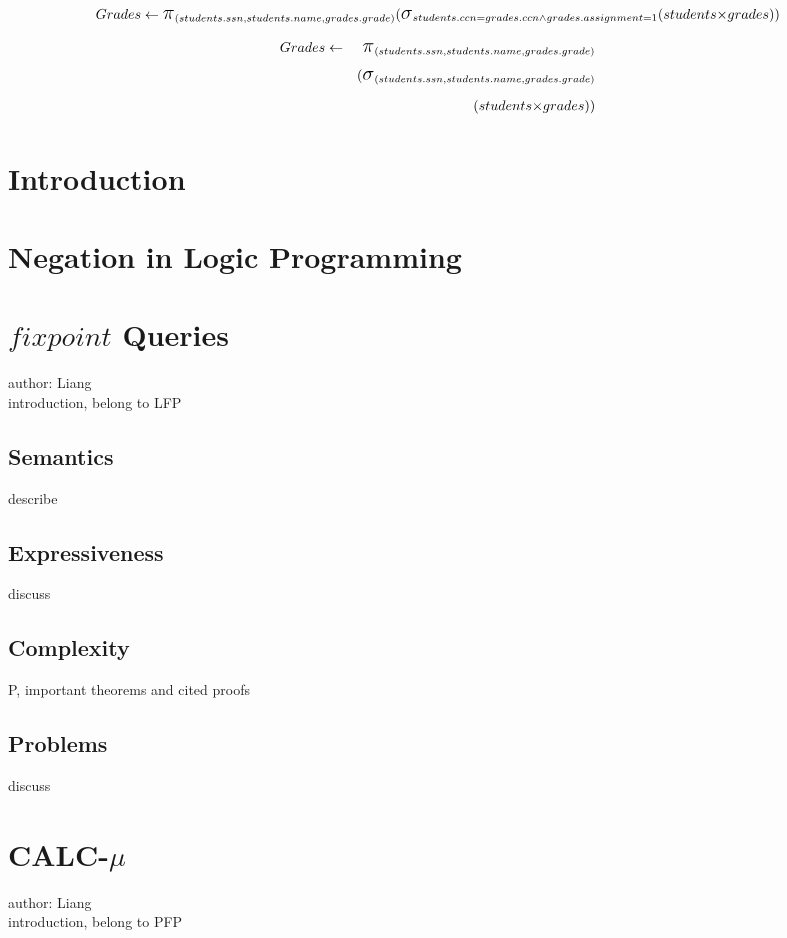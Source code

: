 \documentclass[11pt]{article}
\newcommand{\select}{\mbox{\Large$\sigma$}}
\newcommand{\cross}{\mbox{$\times$}}
\newcommand{\project}{\mbox{\Large$\pi$}}
\begin{document}
\begin{displaymath}
Grades \leftarrow \project_{(students.ssn, students.name, grades.grade)} \\
(\select_{students.ccn = grades.ccn \wedge grades.assignment = 1} \\
(students \cross grades)) \\
\end{displaymath}

\begin{eqnarray*}
Grades & \leftarrow & \project_{(students.ssn, students.name, grades.grade)}  \\
       &            &(\select_{(students.ssn, students.name, grades.grade)}  \\
       &            &          (students \cross grades)) 
\end{eqnarray*}

\section{Introduction}

\section{Negation in Logic Programming}

\section{$fixpoint$ Queries}
author: Liang\\
introduction, belong to LFP
\subsection{Semantics}
describe
\subsection{Expressiveness}
discuss
\subsection{Complexity}
P,
important theorems and cited proofs
\subsection{Problems}
discuss

\section{CALC-$\mu$}
author: Liang\\
introduction, belong to PFP
\end{document}
